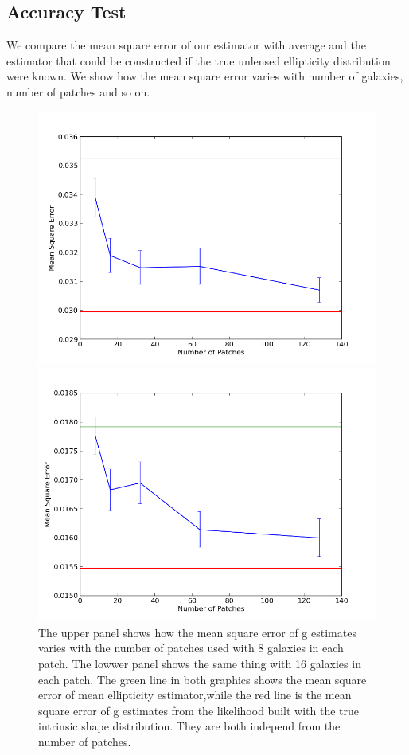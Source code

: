 \documentclass[useAMS,usenatbib]{mn2e}
\begin{document}
\subsection{Accuracy Test}

We compare the mean square error of our estimator with average and
the estimator that could be constructed if the true unlensed ellipticity
distribution were known. We show how the mean square error varies
with number of galaxies, number of patches and so on.
\begin{figure}
\includegraphics[scale=0.48]{fig/Np_step}

\includegraphics[scale=0.48]{fig/N16NP_vary}

\caption{The upper panel shows how the mean square error of g estimates varies
with the number of patches used with 8 galaxies in each patch. The
lowwer panel shows the same thing with 16 galaxies in each patch. The green line in both graphics shows the mean square error of mean ellipticity estimator,while the red line is the mean square error of g estimates from the likelihood built with the true intrinsic shape distribution. They are both independ from the number of patches. }
\end{figure}
\end{document}
